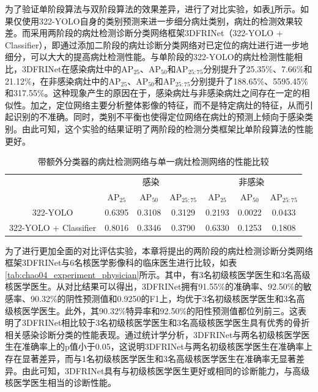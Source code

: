 为了验证单阶段算法与双阶段算法的效果差异，进行了对比实验，如表\ref{tab:chao04_experiment_1vs2}所示。如果仅使用322-YOLO自身的类别预测来进一步细分病灶类别，病灶的检测效果较差。而采用两阶段的病灶检测诊断分类网络框架3DFRINet（322-YOLO + Classifier），即通过添加二阶段的病灶诊断分类网络对已定位的病灶进行进一步地细分，可以大大的提高病灶检测性能。与单阶段的322-YOLO的病灶检测性能相比，3DFRINet在感染病灶中的AP\(_{25}\)、AP\(_{50}\)和AP\(_{25:75}\)分别提升了25.35\%、7.66\%和21.12\%，在非感染病灶中的AP\(_{25}\)、AP\(_{50}\)和AP\(_{25:75}\)分别提升了188.65\%、5595.45\%和317.55\%。这种现象产生的原因在于，感染病灶与非感染病灶之间存在一定的相似性。加之，定位网络主要分析整体影像的特征，而不是特定病灶的特征，从而引起识别的不准确。同时，类别不平衡也使得定位网络在病灶的预测上倾向于感染类别。由此可知，这个实验的结果证明了两阶段的检测分类框架比单阶段算法的性能更好。

\begin{table}[htbp]
  \centering
  \caption{带额外分类器的病灶检测网络与单一病灶检测网络的性能比较}
  \begin{tabular}{ccccccc}
    \toprule
                          & \multicolumn{3}{c}{感染} & \multicolumn{3}{c}{非感染}                                                               \\
                          & AP\(_{25}\)              & AP\(_{50}\)                & AP\(_{25:75}\) & AP\(_{25}\) & AP\(_{50}\) & AP\(_{25:75}\) \\
    \midrule
    322-YOLO              & 0.6395                   & 0.3108                     & 0.3129         & 0.2193      & 0.0022      & 0.0433         \\
    322-YOLO + Classifier & 0.8016                   & 0.3346                     & 0.3790         & 0.6330      & 0.1253      & 0.1808         \\
    \bottomrule
  \end{tabular}
  \label{tab:chao04_experiment_1vs2}
\end{table}

为了进行更加全面的对比评估实验，本章将提出的两阶段的病灶检测诊断分类网络框架3DFRINet与6名核医学影像科的临床医生进行比较，如表\ref{tab:chao04_experiment_physician}所示。其中，有3名初级核医学医生和3名高级核医学医生。从对比结果可以得出，3DFRINet拥有91.55\%的准确率、92.50\%的敏感率、90.32\%的阴性预测值和0.9250的F1上，均优于3名初级核医学医生和3名高级核医学医生。此外，其90.32\%特异率和92.50\%的阳性预测值都位列前三。这表明了3DFRINet相比较于3名初级核医学医生和3名高级核医学医生具有优秀的骨折相关感染诊断分类的性能表现。通过统计学分析，3DFRINet与两名初级核医学医生在准确率上的p值小于0.05，这说明3DFRINet与两名初级核医学医生在准确率上存在显著差异，而与1名初级核医学医生和3名高级核医学医生在准确率无显著差异。由此可知，3DFRINet具有与初级核医学医生更好或相同的诊断能力，与高级核医学医生相当的诊断性能。

